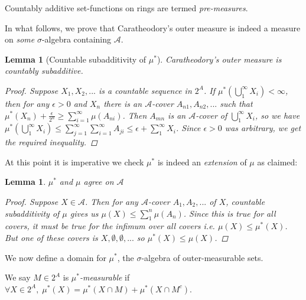 \documentclass[9pt]{report}
\newlength{\tindent}
\newtheorem[L]{theorem}{Theorem}[chapter]
\newtheorem{lemma}[theorem]{Lemma}
\newtheorem[L,nocut]{definition}[theorem]{Definition}
\newtheorem[S,nounderline]{remark}[theorem]{Remarks}
\newenvironment{Proof}{ 
	\\ \setlength{\parindent}{\tindent}
\begin{proof}}
{\end{proof} \setlength{\parindent}{0pt}}
\begin{document}
\begin{remark}
    Countably additive set-functions on rings are termed \emph{pre-measures}.
\end{remark}

In what follows, we prove that Caratheodory's outer measure is indeed a measure on \emph{some} \(\sigma\)-algebra containing \(\mathcal{A}\). 

\begin{lemma}[Countable subadditivity of \(\mu^*\)]
	Caratheodory's outer measure is countably subadditive.
	\begin{Proof}
		Suppose \(X_1,X_2,...\) is a countable sequence in \(2^A\). If \(\mu^*(\bigcup_1^\infty X_i) < \infty\), then for any \(\epsilon>0\) and \(X_n\) there is an \(\mathcal{A}\)-cover \(A_{n1},A_{n2},...\) such that \(\mu^*(X_n) + \frac{\epsilon}{2^n} \geq \sum_{i=1}^\infty \mu(A_{ni})\). Then \(A_{mn}\) is an \(\mathcal{A}\)-cover of \(\bigcup_1^\infty X_i\), so we have \(\mu^*(\bigcup_1^\infty X_i) \leq \sum_{j=1}^\infty \sum_{i=1}^\infty A_{ji} \leq \epsilon + \sum_1^\infty X_i\). Since \(\epsilon>0\) was arbitrary, we get the required inequality.
	\end{Proof}
\end{lemma} 

At this point it is imperative we check \(\mu^*\) is indeed an \emph{extension} of \(\mu\) as claimed:

\begin{lemma}
	\(\mu^*\) and \(\mu\) agree on \(\mathcal{A}\)
	\begin{Proof}
		Suppose \(X\in \mathcal{A}\). Then for any \(\mathcal{A}\)-cover \(A_1,A_2,...\) of \(X\), countable subadditivity of \(\mu\) gives us \(\mu(X) \leq \sum_1^n\mu(A_n)\). Since this is true for all covers, it must be true for the infimum over all covers i.e. \(\mu(X)\leq \mu^*(X)\). But one of these covers is \(X,\emptyset, \emptyset, ...\) so \(\mu^*(X)\leq \mu(X)\). 
	\end{Proof}
\end{lemma}

We now define a domain for \(\mu^*\), the \(\sigma\)-algebra of outer-measurable sets. 

\begin{definition}
	We say \(M \in 2^A\) is \emph{\(\mu^*\)-measurable} if \(\forall X \in 2^A, \; \mu^*(X) = \mu^*(X\cap M) + \mu^*(X \cap M^c)\).
\end{definition}
\end{document}
